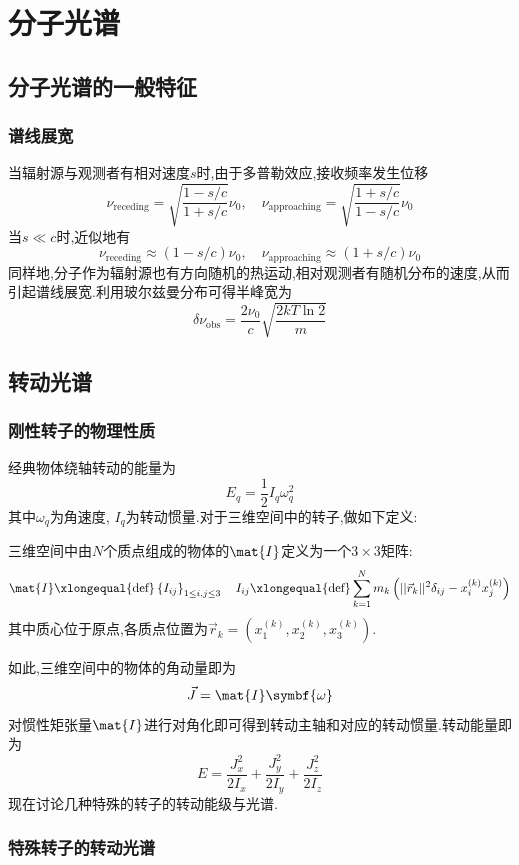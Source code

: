 \documentclass{ctexbook}
\begin{document}
\chapter{分子光谱}
\section{分子光谱的一般特征}
\subsection{谱线展宽}
当辐射源与观测者有相对速度$s$时,由于多普勒效应,接收频率发生位移
\[\nu_{\text{receding}}=\sqrt{\dfrac{1-s/c}{1+s/c}}\nu_0,\quad\nu_{\text{approaching}}=\sqrt{\dfrac{1+s/c}{1-s/c}}\nu_0\]
当$s\ll c$时,近似地有
\[\nu_{\text{receding}}\approx(1-s/c)\nu_0,\quad\nu_{\text{approaching}}\approx(1+s/c)\nu_0\]
\indent 同样地,分子作为辐射源也有方向随机的热运动,相对观测者有随机分布的速度,从而引起谱线展宽.利用玻尔兹曼分布可得半峰宽为
\[\delta\nu_{\text{obs}}=\dfrac{2\nu_0}{c}\sqrt{\dfrac{2kT\ln 2}{m}}\]
\section{转动光谱}
\subsection{刚性转子的物理性质}
经典物体绕轴转动的能量为
\[E_q=\dfrac12I_q\omega_q^2\]
其中$\omega_q$为角速度, $I_q$为转动惯量.对于三维空间中的转子,做如下定义:
\begin{definition}[惯性矩张量]
    三维空间中由$N$个质点组成的物体的$\mat{I}$定义为一个$3\times 3$矩阵:
    \[\mat{I}\xlongequal{\text{def}}\left\{I_{ij}\right\}_{1\leq i,j\leq 3}\quad I_{ij}\xlongequal{\text{def}}\sum_{k=1}^{N}m_k\left(||\vec{r}_k||^2\delta_{ij}-x_i^{(k)}x_{j}^{(k)}\right)\]
    其中质心位于原点,各质点位置为$\vec{r}_k=\left(x_1^{(k)},x_2^{(k)},x_3^{(k)}\right)$.
\end{definition}
如此,三维空间中的物体的角动量即为
\[\vec{J}=\mat{I}\symbf{\omega}\]
对惯性矩张量$\mat{I}$进行对角化即可得到转动主轴和对应的转动惯量.转动能量即为
\[E=\dfrac{J_x^2}{2I_x}+\dfrac{J_y^2}{2I_y}+\dfrac{J_z^2}{2I_z}\]
现在讨论几种特殊的转子的转动能级与光谱.
\subsection{特殊转子的转动光谱}
\end{document}
